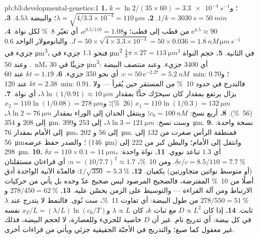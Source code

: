 \begin{solution}{pb:b3:developmental-genetics:1}
\textbf{1.} $k = \ln 2/(35\times 60) = \qty{3.3e-4}{s^{-1}}$؛ و$1/k =
\qty{3030}{s} = \qty{50}{min}$.
\textbf{2.} $\lambda = \sqrt{4/3.3\times 10^{-4}} = \qty{110}{\micro m}$؛
والبيضة $4.5\lambda$.
\textbf{3.} $\mathrm{e}^{4.5} \approx 90$ من قطب إلى قطب؛
و$\mathrm{e}^{8.5/110} = 1.08$، أي تغيّر \qty{8}{\%} لكل نواة.
\textbf{4.} $J = 50\times\sqrt{4\times 3.3\times 10^{-4}} = 50\times
0.036 = \qty{1.8}{nM\,\micro m\,s^{-1}}$. والنانومولار الواحد $0.6$ جزيء
في \unit{\micro m^3}، فنحو $1.1$ جزيء في \unit{\micro m^2}
في الثانية.
\textbf{5.} حجم النواة $\tfrac{4}{3}\pi\times 27 = \qty{113}{\micro
m^3}$. وعند \qty{50}{nM}، $30$ جزيئًا في \unit{\micro m^3}:
أي \num{3400} جزيء. وعند منتصف البيضة $c = 50\,\mathrm{e}^{-2.27} =
\qty{5.2}{nM}$: أي نحو \num{350} جزيء.
\textbf{6.} $kt = 1.19$ عند \qty{60}{min}: $0.70$؛ و$kt = 2.38$ عند
\qty{120}{min}: $0.91$. فالتدرج في حدود \qty{10}{\%} من المستقر
حين يُقرأ --- ولا يزال يرتفع بمقدار كان سيحرّك حدًّا بمقدار
$\lambda\ln(1/0.91) \approx \qty{10}{\micro m}$، أي نواة.
\textbf{7.} $x_{1} = 110\ln(1/0.3) = \qty{132}{\micro m}$
(\qty{26}{\%})؛ و$x_{2} = 110\ln(1/0.08) = \qty{278}{\micro m}$
(\qty{56}{\%}).
\textbf{8.} أربع نسخ: $c_{0} = \qty{100}{nM}$؛ وينتقل الحدان
إلى الوراء بمقدار $\lambda\ln 2 = \qty{76}{\micro m}$، إلى $208$ و
\qty{354}{\micro m}. وست نسخ: $\lambda\ln 3 = \qty{121}{\micro m}$،
إلى $253$ و\qty{399}{\micro m}.
\textbf{9.} نسخة واحدة: إلى الأمام بمقدار \qty{76}{\micro m}، إلى $56$ و
\qty{202}{\micro m}. فمنطقة الرأس صغرت من $132$ إلى
\qty{56}{\micro m}؛ والصدر حفظ عرضه (\qty{146}{\micro m}) وانتقل
إلى الأمام؛ والبطن كبر من $222$ إلى \qty{298}{\micro m}.
\textbf{10.} $\delta x = 110\times 0.1 = \qty{11}{\micro m}$، أي $1.3$
تباعد نووي.
\textbf{11.} نواة واحدة: $\delta c/c = 8.5/110 = \qty{7.7}{\%}$. ومن
\qty{10}{\%}، $n = (10/7.7)^{2} \approx 1.7$: أي قراءتان مستقلتان
(أو متوسط نواتين متجاورتين) يكفيان.
\textbf{12.} $1/\sqrt{350} = \qty{5.3}{\%}$: فالعدّة الآنية الواحدة
أدق أصلًا من \qty{10}{\%} المفترضة، فالضجيج المرصود ليس ضجيج
عدّ وحده بل يأتي من حركيات الارتباط ومن آلة القراءة ---
والتوسيط على الزمن يحسّن عليه.
\textbf{13.} $278/450 = \qty{62}{\%}$ و$278/550 = \qty{51}{\%}$ من
طول البيضة: أي تفاوت \qty{11}{\%}، ست نُوى. فالنمط لا يتدرج
عند $\lambda$ ثابت.
\textbf{14.} إذا كان $D \propto L^{2}$ مع ثبات $k$، كان $\lambda \propto L$
و$x_{T}/L = (\lambda/L)\ln(c_{0}/T)$ نفسه في كل بيضة: أي تدريج
تام. غير أن $D$ خاصية للجزيء وللعصارة، لا لحجم البيضة، فذلك
غير معقول كما صيغ؛ والتدريج في الأجنّة الحقيقية جزئي ويأتي
من قراءات أخرى.

\end{solution}
